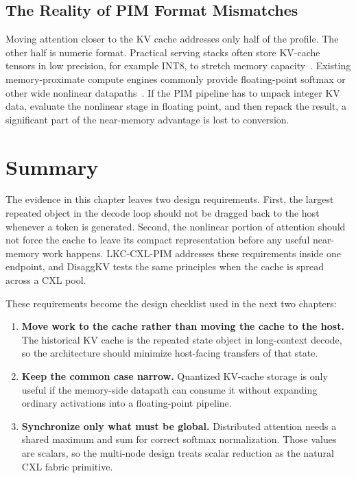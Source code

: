 \subsection{The Reality of PIM Format Mismatches}

Moving attention closer to the KV cache addresses only half of the profile. The other half is numeric format. Practical serving stacks often store KV-cache tensors in low precision, for example INT8, to stretch memory capacity~\cite{llm_outliers}. Existing memory-proximate compute engines commonly provide floating-point softmax or other wide nonlinear datapaths~\cite{pim_quant}. If the PIM pipeline has to unpack integer KV data, evaluate the nonlinear stage in floating point, and then repack the result, a significant part of the near-memory advantage is lost to conversion.

\section{Summary}

The evidence in this chapter leaves two design requirements. First, the largest repeated object in the decode loop should not be dragged back to the host whenever a token is generated. Second, the nonlinear portion of attention should not force the cache to leave its compact representation before any useful near-memory work happens. LKC-CXL-PIM addresses these requirements inside one endpoint, and DisaggKV tests the same principles when the cache is spread across a CXL pool.

These requirements become the design checklist used in the next two chapters:
\begin{enumerate}
    \item \textbf{Move work to the cache rather than moving the cache to the host.} The historical KV cache is the repeated state object in long-context decode, so the architecture should minimize host-facing transfers of that state.
    \item \textbf{Keep the common case narrow.} Quantized KV-cache storage is only useful if the memory-side datapath can consume it without expanding ordinary activations into a floating-point pipeline.
    \item \textbf{Synchronize only what must be global.} Distributed attention needs a shared maximum and sum for correct softmax normalization. Those values are scalars, so the multi-node design treats scalar reduction as the natural CXL fabric primitive.
\end{enumerate}
